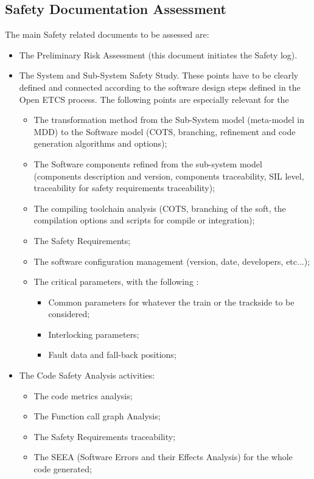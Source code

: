 \documentclass{template/openetcs_article}
\begin{document}
\subsection{Safety Documentation Assessment}
The main Safety related documents to be assessed are:
\begin{itemize}
\item The Preliminary Risk Assessment (this document initiates the Safety log).
\item The System and Sub-System Safety Study. These points have to be clearly defined and connected according to the software design steps defined in the Open ETCS process. The following points are especially relevant for the
	\begin{itemize}
	\item The transformation method from the Sub-System model (meta-model in MDD) to the Software model (COTS, branching, refinement and code generation algorithms and options);
	\item The Software components refined from the sub-system model (components description and version, components traceability, SIL level, traceability for safety requirements traceability);
	\item The compiling toolchain analysis (COTS, branching of the soft, the compilation options and scripts for compile or integration);
	\item The Safety Requirements;
	\item The software configuration management (version, date, developers, etc...);
	\item The critical parameters, with the following :
		\begin{itemize}
		\item Common parameters for whatever the train or the trackside to be considered;
		\item Interlocking parameters;
		\item Fault data and fall-back positions;
		\end{itemize}
	\end{itemize}
\item The Code Safety Analysis activities:
	\begin{itemize}
	\item The code metrics analysis;
	\item The Function call graph Analysis;
	\item The Safety Requirements traceability;
	\item The SEEA (Software Errors and their Effects Analysis) for the whole code generated;

\end{itemize}
\end{itemize}
\end{document}
